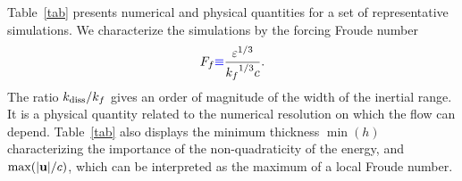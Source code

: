 Table~\ref{tab} presents numerical and physical quantities for a set
of representative simulations.
%
We characterize the simulations by the forcing Froude number
\begin{equation}
F_f {\color{blue}\equiv} \frac{\varepsilon^{1/3}}{{k_f}^{1/3}c}.
\end{equation}
%
The ratio $\kdiss/k_f$ gives an order of magnitude of the width of the
inertial range.  It is a physical quantity related to the numerical
resolution on which the flow can depend.
%
Table~\ref{tab} also displays the minimum thickness $\min(h)$
characterizing the importance of the non-quadraticity of the energy,
and $\max(|\textbf{u}|/c)$, which can be interpreted as the maximum of a
local Froude number.




